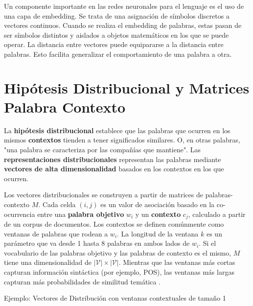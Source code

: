 Un componente importante en las redes neuronales para el lenguaje es el uso de una capa de embedding.
Se trata de una asignación de símbolos discretos a vectores continuos.
Cuando se realiza el embedding de palabras, estas pasan de ser símbolos distintos y aislados a objetos matemáticos en los que se puede operar.
La distancia entre vectores puede equipararse a la distancia entre palabras.
Esto facilita generalizar el comportamiento de una palabra a otra.

\section{Hipótesis Distribucional y Matrices Palabra Contexto}
La \textbf{hipótesis distribucional} \cite{harris1954} establece que las palabras que ocurren en los mismos \textbf{contextos} tienden a tener significados similares.
O, en otras palabras, "una palabra se caracteriza por las compañías que mantiene".
Las \textbf{representaciones distribucionales} representan las palabras mediante \textbf{vectores de alta dimensionalidad} basados en los contextos en los que ocurren.

Los vectores distribucionales se construyen a partir de matrices de palabras-contexto $M$.
Cada celda $(i,j)$ es un valor de asociación basado en la co-ocurrencia entre una \textbf{palabra objetivo} $w_i$ y un \textbf{contexto} $c_j$, calculado a partir de un corpus de documentos.
Los contextos se definen comúnmente como ventanas de palabras que rodean a $w_i$.
La longitud de la ventana $k$ es un parámetro que va desde 1 hasta 8 palabras en ambos lados de $w_i$.
Si el vocabulario de las palabras objetivo y las palabras de contexto es el mismo, $M$ tiene una dimensionalidad de $|\mathcal{V}| \times |\mathcal{V}|$.
Mientras que las ventanas más cortas capturan información sintáctica (por ejemplo, POS), las ventanas más largas capturan más probabilidades de similitud temática \cite{goldberg2016primer, JurafskyBook}.

Ejemplo: Vectores de Distribución con ventanas contextuales de tamaño 1

